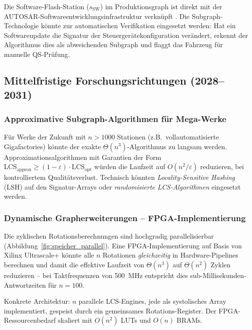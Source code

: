 ﻿\documentclass[a4paper,12pt]{article}
\theoremstyle{definition}
\begin{document}
Die Software-Flash-Station ($s_{\mathrm{SW}}$) im Produktionsgraph ist direkt mit der
AUTOSAR-Softwareentwicklungsinfrastruktur verknüpft \cite{autosar2023}. Die Subgraph-Technologie
könnte zur automatischen Verifikation eingesetzt werden: Hat ein Softwareupdate die
Signatur der Steuergerätekonfiguration verändert, erkennt der Algorithmus dies als
abweichenden Subgraph und flaggt das Fahrzeug für manuelle QS-Prüfung.

\subsection{Mittelfristige Forschungsrichtungen (2028--2031)}

\subsubsection{Approximative Subgraph-Algorithmen für Mega-Werke}

Für Werke der Zukunft mit $n > 1000$ Stationen (z.B.\ vollautomatisierte Gigafactories)
könnte der exakte $\Theta(n^3)$-Algorithmus zu langsam werden. Approximationsalgorithmen
mit Garantien der Form $\mathrm{LCS}_{\text{approx}} \geq (1-\varepsilon) \cdot \mathrm{LCS}_{\text{opt}}$
würden die Laufzeit auf $O(n^2 / \varepsilon)$ reduzieren, bei kontrolliertem Qualitätsverlust.
Technisch könnten \emph{Locality-Sensitive Hashing} (LSH) auf den Signatur-Arrays oder
\emph{randomisierte LCS-Algorithmen} \cite{charikar2004approximate} eingesetzt werden.

\subsubsection{Dynamische Grapherweiterungen -- FPGA-Implementierung}

Die zyklischen Rotationsberechnungen sind hochgradig parallelisierbar (Abbildung~\ref{fig:speicher_parallel}).
Eine FPGA-Implementierung auf Basis von Xilinx Ultrascale+ \cite{xilinx_ultrascale} könnte
alle $n$ Rotationen \emph{gleichzeitig} in Hardware-Pipelines berechnen und damit die
effektive Laufzeit von $\Theta(n^3)$ auf $\Theta(n^2)$ Zyklen reduzieren -- bei
Taktfrequenzen von 500~MHz entspricht dies sub-Millisekunden-Antwortzeiten für $n=100$.

Konkrete Architektur: $n$ parallele LCS-Engines, jede als systolisches Array implementiert,
gespeist durch ein gemeinsames Rotations-Register. Der FPGA-Ressourcenbedarf skaliert mit
$O(n^2)$ LUTs und $O(n)$ BRAMs.
\end{document}
